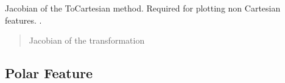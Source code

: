 \documentclass[letterpaper,10pt,english]{sphinxmanual}
\begin{document}
\begin{fulllineitems}
\begin{fulllineitems}
\begin{quote}
\begin{description}
\end{description}\end{quote}

\end{fulllineitems}


\begin{fulllineitems}
\label{\detokenize{Feature:Feature.CartesianFeature.J_2c}}
\pysigstartsignatures
{}
\pysigstopsignatures
\sphinxAtStartPar
Jacobian of the ToCartesian method. Required for plotting non Cartesian features.
.
\begin{quote}\begin{description}
\sphinxAtStartPar
Jacobian of the transformation

\end{description}\end{quote}

\end{fulllineitems}


\end{fulllineitems}



\subsection{Polar Feature}
\label{\detokenize{Feature:polar-feature}}
\begin{figure}[htbp]
\centering

\noindent{}
\end{figure}
\end{document}
